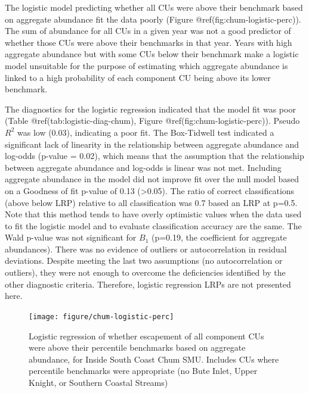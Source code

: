 \documentclass[
]{article}
\begin{document}
The logistic model predicting whether all CUs were above their benchmark
based on aggregate abundance fit the data poorly (Figure
@ref(fig:chum-logistic-perc)). The sum of abundance for all CUs in a
given year was not a good predictor of whether those CUs were above
their benchmarks in that year. Years with high aggregate abundance but
with some CUs below their benchmark make a logistic model unsuitable for
the purpose of estimating which aggregate abundance is linked to a high
probability of each component CU being above its lower benchmark.

The diagnostics for the logistic regression indicated that the model fit
was poor (Table @ref(tab:logistic-diag-chum), Figure
@ref(fig:chum-logistic-perc)). Pseudo \(R^2\) was low (0.03), indicating
a poor fit. The Box-Tidwell test indicated a significant lack of
linearity in the relationship between aggregate abundance and log-odds
(p-value = 0.02), which means that the assumption that the relationship
between aggregate abundance and log-odds is linear was not met.
Including aggregate abundance in the model did not improve fit over the
null model based on a Goodness of fit p-value of 0.13
(\textgreater0.05). The ratio of correct classifications (above below
LRP) relative to all classification was 0.7 based an LRP at p=0.5. Note
that this method tends to have overly optimistic values when the data
used to fit the logistic model and to evaluate classification accuracy
are the same. The Wald p-value was not significant for \(B_{1}\)
(p=0.19, the coefficient for aggregate abundances). There was no
evidence of outliers or autocorrelation in residual deviations. Despite
meeting the last two assumptions (no autocorrelation or outliers), they
were not enough to overcome the deficiencies identified by the other
diagnostic criteria. Therefore, logistic regression LRPs are not
presented here.

\begin{figure}

{\centering \texttt{[image: figure/chum-logistic-perc]} 

}

\caption{Logistic regression of whether escapement of all component CUs were above their percentile benchmarks based on aggregate abundance, for Inside South Coast Chum SMU. Includes CUs where percentile benchmarks were appropriate (no Bute Inlet, Upper Knight, or Southern Coastal Streams)}\label{fig:chum-logistic-perc}
\end{figure}

\needspace{0.35\textheight}
\end{document}
